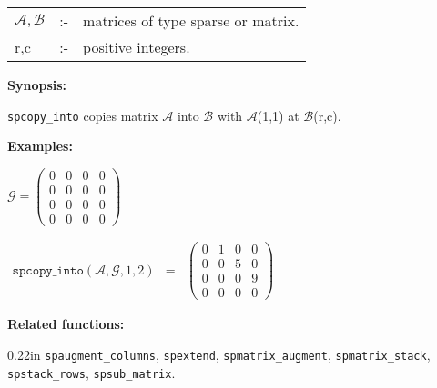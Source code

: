 \hspace*{0.1in} 
\begin{tabular}{l l l}
$\mathcal{A,B}$ &:-& matrices of type sparse or matrix. \\
r,c          &:-& positive integers. 
\end{tabular}

\textbf{Synopsis:} %

\hspace*{0.175in} \texttt{spcopy\_into} copies matrix $\mathcal{A}$ into 
                $\mathcal{B}$ with $\mathcal{A}$(1,1) at $\mathcal{B}$(r,c).

\textbf{Examples:} 

\begin{flushleft}
\hspace*{0.175in}
\begin{math}  
\mathcal{G} = \left( \begin{array}{cccc} 0 & 0 & 0 & 0 \\ 0 & 0 & 0 & 0 \\
0 & 0 & 0 & 0 \\ 0 & 0 & 0 & 0
\end{array} \right)
\end{math}  
\end{flushleft}

\begin{flushleft}
\hspace*{0.1in}
\begin{math}  
\begin{array}{ccc}
\texttt{spcopy\_into}(\mathcal{A,G},1,2) & = & 
\left( \begin{array}{cccc} 0 & 1 & 0 & 0 \\ 0 & 0 & 5 & 0 \\ 0 & 0 & 0 
& 9 \\ 0 & 0 & 0 & 0  
\end{array} \right)
\end{array}
\end{math}  
\end{flushleft}

\textbf{Related functions:} 

\begin{addtolength}{\leftskip}{0.22in}
\texttt{spaugment\_columns}, \texttt{spextend}, \texttt{spmatrix\_augment}, 
\texttt{spmatrix\_stack}, \texttt{spstack\_rows}, \texttt{spsub\_matrix}.

\end{addtolength}


